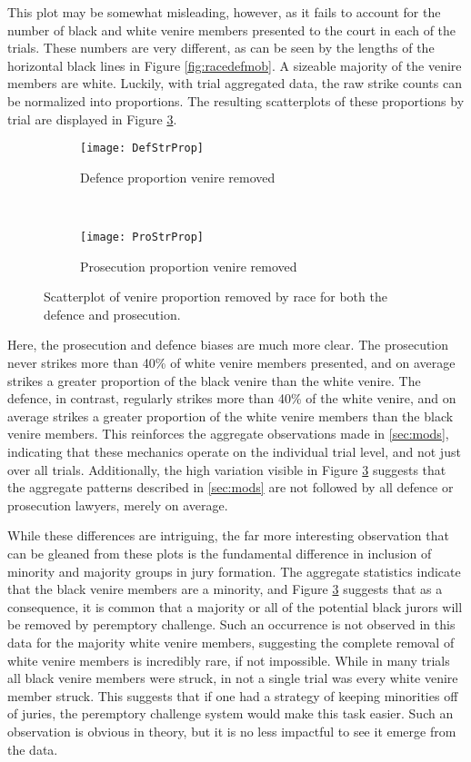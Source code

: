 This plot may be somewhat misleading, however, as it fails to account for
the number of black and white venire members presented to the court in each of the trials. These numbers are very different, as can be seen by the
lengths of the horizontal black lines in Figure \ref{fig:racedefmob}. A sizeable majority of the venire members are
white. Luckily, with trial aggregated data, the raw strike counts can be normalized into proportions. The resulting scatterplots
of these proportions by trial are displayed in Figure \ref{fig:defproprop}.

\begin{figure}[h!]
  \centering
  \begin{subfigure}{0.45\textwidth}
    \texttt{[image: DefStrProp]}
    \caption{\footnotesize Defence proportion venire removed}
    \label{fig:defraceprop}
  \end{subfigure}
  ~
  \begin{subfigure}{0.45\textwidth}
    \texttt{[image: ProStrProp]}
    \caption{\footnotesize Prosecution proportion venire removed}
    \label{fig:proraceprop}
  \end{subfigure}
  \caption[Racial Strike Proportions by Party]
  {\footnotesize Scatterplot of venire proportion removed by race for both the defence and prosecution.}
  \label{fig:defproprop}
\end{figure}

Here, the prosecution and defence biases are much more clear. The prosecution never strikes more than 40\% of white venire members
presented, and on average strikes a greater proportion of the black venire than the white venire. The defence, in contrast,
regularly strikes more than 40\% of the white venire, and on average strikes a greater proportion of the white venire members than
the black venire members. This reinforces the aggregate observations made in \ref{sec:mods}, indicating that these mechanics
operate on the individual trial level, and not just over all trials. Additionally, the high variation visible in Figure
\ref{fig:defproprop} suggests that the aggregate patterns described in \ref{sec:mods} are not followed by all defence or
prosecution lawyers, merely on average.

While these differences are intriguing, the far more interesting observation that can be gleaned from these plots is the
fundamental difference in inclusion of minority and majority groups in jury formation. The aggregate statistics indicate that the
black venire members are a minority, and Figure \ref{fig:defproprop} suggests that as a consequence, it is common that a majority
or all of the potential black jurors will be removed by peremptory
challenge. Such an occurrence is not observed in this data for the
majority white venire members, suggesting the complete removal of
white venire members is incredibly rare, if not impossible. While in many trials all black venire members were struck, in not a single trial was
every white venire member struck. This suggests that if one had a strategy of keeping minorities off of juries, the peremptory
challenge system would make this task easier. Such an observation is obvious in theory, but it is no less impactful to see it
emerge from the data.

